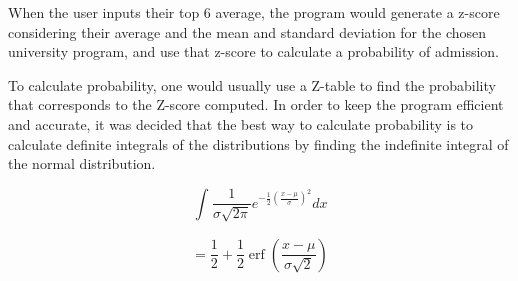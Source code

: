 \documentclass{article}
\DeclareMathOperator{\errorfunction}{erf}
\begin{document}
    When the user inputs their top 6 average, the program would generate a z-score considering their average and the mean and standard deviation for the chosen university program, and use that z-score to calculate a probability of admission.

    To calculate probability, one would usually use a Z-table to find the probability that corresponds to the Z-score computed. In order to keep the program efficient and accurate, it was decided that the best way to calculate probability is to calculate definite integrals of the distributions by finding the indefinite integral of the normal distribution.

    \[\int_{}^{}\frac{1}{\sigma\sqrt{2\pi}}e^{-\frac{1}{2}(\frac{x-\mu}{\sigma})^2}dx\]

    \[= \frac{1}{2}+\frac{1}{2}\errorfunction(\frac{x-\mu}{\sigma\sqrt{2}})\]
\end{document}
